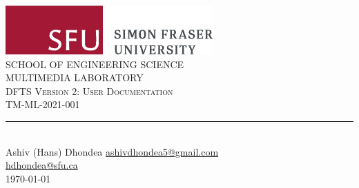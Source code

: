 \begin{titlepage}
	\centering
	\includegraphics[scale = 0.75]{Figures/SFUhorizontallogorgb.pdf}\\[1.0 cm]
	\textsc{SCHOOL OF ENGINEERING SCIENCE}\\[0.2 cm]
	\textsc{MULTIMEDIA LABORATORY}\\[2.2 cm]
	\textsc{\Large DFTS Version 2: User Documentation}\\[0.5 cm]
	\textsc{\normalsize TM-ML-2021-001 }\\[0.2 cm]
	\rule{\linewidth}{0.2 mm} \\[0.4 cm]
	
	
	\vspace*{2cm}
	Ashiv (Hans) Dhondea\linebreak
	\href{mailto:ashivdhondea5@gmail.com}{ashivdhondea5@gmail.com} 
	\\
	\href{mailto:hdhondea@sfu.ca}{hdhondea@sfu.ca}
	\\
	\vspace{5cm}
	\today
	
	\vfill
	
\end{titlepage}